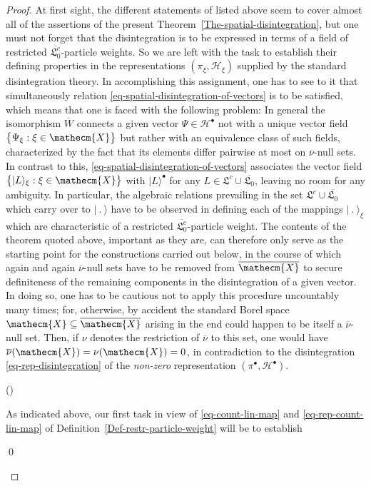 \documentclass[11pt,twoside,openright]{report}
\theoremstyle{definition}
\theoremstyle{plain}
\theoremstyle{remark}
\theoremstyle{assumption}
\newcommand{\bset}[1]{\bigl\{ #1 \bigr\}}
\newcommand{\ket}[1]{\vert #1 \rangle}
\newcommand{\bullket}[1]{\vert #1 \rangle^\bullet}
\newcommand{\xiket}[1]{\vert #1 \rangle_\xi}
\newcommand{\Xecm}{\mathecm{X}}
\newcommand{\Hscr}{\mathscr{H}}
\newcommand{\Xecmbar}{\overline{\mathecm{X}}}
\newcommand{\Wbar}{\overline{W}}
\newcommand{\nubar}{\overline{\nu}}
\newcommand{\idealcount}{\mathfrak{L}^c}
\newcommand{\vacbar}{\overline{\mathfrak{L}_0}}
\newcommand{\vaccountbar}{\overline{\mathfrak{L}_0^c}}
\newcommand{\Hbullet}{\mathscr{H}^\bullet}
\newcounter{proofitem}
\newenvironment{prooflist}{\begin{list}{(\roman{proofitem})}%
  {\usecounter{proofitem} \setlength{\topsep}{0ex}%
   \setlength{\parsep}{0.2ex} \setlength{\itemsep}{0.4ex}%
   \setlength{\leftmargin}{0em} \setlength{\itemindent}{0.5em}%
   \setlength{\listparindent}{1em}}}{\qed \end{list}}
\begin{document}
\begin{proof}
  At first sight, the different statements of
  \cite[Theorem~8.5.2]{dixmier:1982} listed above seem to cover almost
  all of the assertions of the present
  Theorem~\ref{The-spatial-disintegration}, but one must not forget
  that the disintegration is to be expressed in terms of a field of
  restricted $\vaccountbar$-particle weights. So we are left with the
  task to establish their defining properties in the representations
  $( \pi_\xi , \Hscr_\xi )$ supplied by the standard disintegration
  theory. In accomplishing this assignment, one has to see to it that
  simultaneously relation \eqref{eq-spatial-disintegration-of-vectors}
  is to be satisfied, which means that one is faced with the following
  problem: In general the isomorphism $\Wbar$ connects a given vector
  $\Psi \in \Hbullet$ not with a unique vector field $\bset{\Psi_\xi :
  \xi \in \Xecm}$ but rather with an equivalence class of such fields,
  characterized by the fact that its elements differ pairwise at most
  on $\nubar$-null sets. In contrast to this,
  \eqref{eq-spatial-disintegration-of-vectors} associates the vector
  field $\bset{\xiket{L} : \xi \in \Xecm}$ with $\bullket{L}$ for any
  $L \in \idealcount \cup \vacbar$, leaving no room for any
  ambiguity. In particular, the algebraic relations prevailing in the
  set $\idealcount \cup \vacbar$ which carry over to $\ket{~.~}$ have
  to be observed in defining each of the mappings $\xiket{~.~}$ which
  are characteristic of a restricted $\vaccountbar$-particle
  weight. The contents of the theorem quoted above, important as they
  are, can therefore only serve as the starting point for the
  constructions carried out below, in the course of which again and
  again $\nubar$-null sets have to be removed from $\Xecmbar$ to
  secure definiteness of the remaining components in the
  disintegration of a given vector. In doing so, one has to be
  cautious not to apply this procedure uncountably many times; for,
  otherwise, by accident the standard Borel space $\Xecm \subseteq
  \Xecmbar$ arising in the end could happen to be itself a
  $\nubar$-null set. Then, if $\nu$ denotes the restriction of
  $\nubar$ to this set, one would have $\nubar ( \Xecm ) = \nu ( \Xecm
  ) = 0$, in contradiction to the disintegration
  \eqref{eq-rep-disintegration} of the \emph{non-zero} representation
  $( \pi^\bullet , \Hbullet )$.
  \begin{prooflist}
  \item As indicated above, our first task in view of
    \eqref{eq-count-lin-map} and \eqref{eq-rep-count-lin-map} of
    Definition~\ref{Def-restr-particle-weight} will be to establish

\end{prooflist}
\end{proof}
\end{document}
